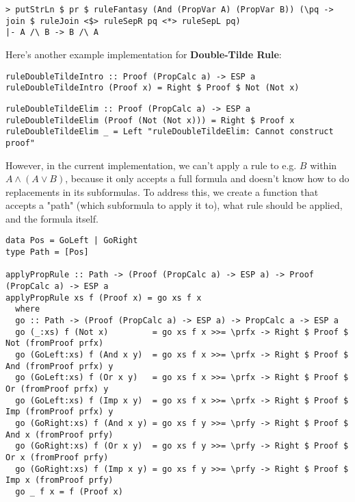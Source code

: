 \documentclass{article}
\begin{document}
\begin{lstlisting}
> putStrLn $ pr $ ruleFantasy (And (PropVar A) (PropVar B)) (\pq -> join $ ruleJoin <$> ruleSepR pq <*> ruleSepL pq)
|- A /\ B -> B /\ A
\end{lstlisting}

Here's another example implementation for \textbf{Double-Tilde Rule}:

\begin{minipage}{0.45\textwidth}
\begin{lstlisting}
ruleDoubleTildeIntro :: Proof (PropCalc a) -> ESP a
ruleDoubleTildeIntro (Proof x) = Right $ Proof $ Not (Not x)
\end{lstlisting}
\end{minipage}
\begin{minipage}{0.53\textwidth}
\begin{lstlisting}
ruleDoubleTildeElim :: Proof (PropCalc a) -> ESP a
ruleDoubleTildeElim (Proof (Not (Not x))) = Right $ Proof x
ruleDoubleTildeElim _ = Left "ruleDoubleTildeElim: Cannot construct proof"
\end{lstlisting}
\end{minipage}

However, in the current implementation, we can't apply a rule to e.g. $B$ within $A \land (A \lor B)$, because it only accepts a full formula and doesn't know how to do replacements in its subformulas. To address this, we create a function that accepts a "path" (which subformula to apply it to), what rule should be applied, and the formula itself.

\begin{lstlisting}
data Pos = GoLeft | GoRight
type Path = [Pos]

applyPropRule :: Path -> (Proof (PropCalc a) -> ESP a) -> Proof (PropCalc a) -> ESP a
applyPropRule xs f (Proof x) = go xs f x
  where
  go :: Path -> (Proof (PropCalc a) -> ESP a) -> PropCalc a -> ESP a
  go (_:xs) f (Not x)         = go xs f x >>= \prfx -> Right $ Proof $ Not (fromProof prfx)
  go (GoLeft:xs) f (And x y)  = go xs f x >>= \prfx -> Right $ Proof $ And (fromProof prfx) y
  go (GoLeft:xs) f (Or x y)   = go xs f x >>= \prfx -> Right $ Proof $ Or (fromProof prfx) y
  go (GoLeft:xs) f (Imp x y)  = go xs f x >>= \prfx -> Right $ Proof $ Imp (fromProof prfx) y
  go (GoRight:xs) f (And x y) = go xs f y >>= \prfy -> Right $ Proof $ And x (fromProof prfy)
  go (GoRight:xs) f (Or x y)  = go xs f y >>= \prfy -> Right $ Proof $ Or x (fromProof prfy)
  go (GoRight:xs) f (Imp x y) = go xs f y >>= \prfy -> Right $ Proof $ Imp x (fromProof prfy)
  go _ f x = f (Proof x)
\end{lstlisting}
\end{document}

